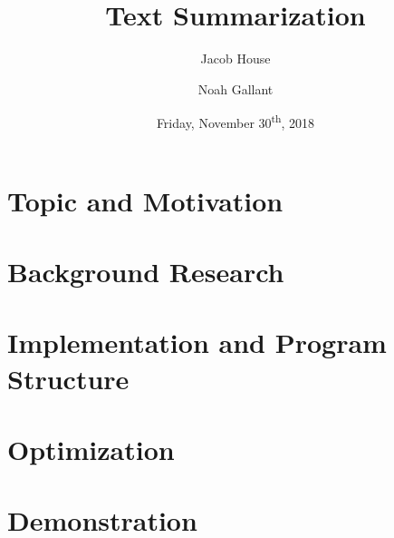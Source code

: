 \documentclass[12pt]{article}
\title{Text Summarization}
\author{Jacob House \and Noah Gallant}
\date{Friday, November 30\textsuperscript{th}, 2018}
\begin{document}
	\maketitle
	\tableofcontents 
	
	\section{Topic and Motivation}
	
	
	\section{Background Research}
	
	
	\section{Implementation and Program Structure}
	
	
	\section{Optimization}
	
	
	\printbibliography
	\appendix
	\section{Demonstration}
	
	
\end{document}
